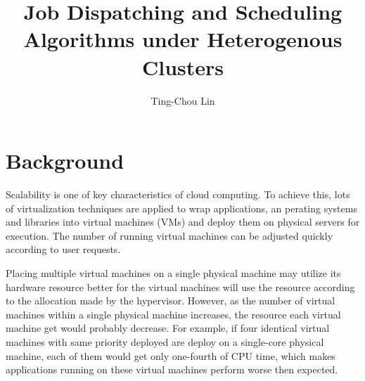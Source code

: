 \documentclass[11pt]{article}
\title{\textbf{Job Dispatching and Scheduling Algorithms under Heterogenous Clusters}}
\author{Ting-Chou Lin\\}
\date{}
\begin{document}
\maketitle

\section{Background}

Scalability is one of key characteristics of cloud computing.  To
achieve this, lots of virtualization
techniques\cite{secure_virt_for_cloud}\cite{cloud_issue} are applied to
wrap applications, an perating systems and libraries into virtual
machines (VMs) and deploy them on physical servers for execution.  The
number of running virtual machines can be adjusted quickly according to
user requests.  

Placing multiple virtual machines on a single physical machine may
utilize its hardware resource better for the virtual machines will use
the resource according to the allocation made by the hypervisor.
However, as the number of virtual machines within a single physical
machine increases, the resource each virtual machine get would probably
decrease\cite{resource_overbooking}.  For example, if four identical
virtual machines with same priority deployed are deploy on a single-core
physical machine, each of them would get only one-fourth of CPU time,
which makes applications running on these virtual machines perform
worse then expected.


\renewcommand\refname{Reference}


\end{document}
